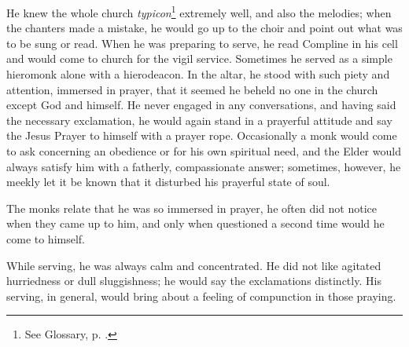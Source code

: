 He knew the whole church \textit{typicon}\footnote{See Glossary, p. \pageref{typicon}.} extremely well, and also the melodies; when the chanters made a mistake, he would go up to the choir and point out what was to be sung or read. When he was preparing to serve, he read Compline in his cell and would come to church for the vigil service. Sometimes he served as a simple hieromonk alone with a hierodeacon. In the altar, he stood with such piety and attention, immersed in prayer, that it seemed he beheld no one in the church except God and himself. He never engaged in any conversations, and having said the necessary exclamation, he would again stand in a prayerful attitude and say the Jesus Prayer to himself with a prayer rope. Occasionally a monk would come to ask concerning an obedience or for his own spiritual need, and the Elder would always satisfy him with a fatherly, compassionate answer; sometimes, however, he meekly let it be known that it disturbed his prayerful state of soul.

The monks relate that he was so immersed in prayer, he often did not notice when they came up to him, and only when questioned a second time would he come to himself.

While serving, he was always calm and concentrated. He did not like agitated hurriedness or dull sluggishness; he would say the exclamations distinctly. His serving, in general, would bring about a feeling of compunction in those praying.

